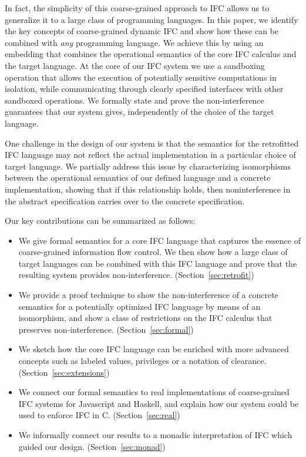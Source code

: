 In fact, the simplicity of this coarse-grained approach
to IFC allows us to generalize it to a large class of programming
languages.  In this paper, we identify the key concepts of coarse-grained
dynamic IFC and show how these can be combined with \emph{any} programming
language.  We achieve this
by using an embedding that combines the operational semantics
of the core IFC calculus and the target language.
At the core of our IFC system we use a sandboxing operation that allows
the execution of potentially sensitive computations in isolation,
while communicating through clearly specified interfaces with other
sandboxed operations.
We formally state and prove the non-interference guarantees that our
system gives, independently of the choice of the target language.

One challenge in the design of our system is that the semantics for the
retrofitted IFC language may not reflect the actual implementation in a
particular choice of target language.  We partially address this issue
by characterizing isomorphisms between the operational semantics of our
defined language and a concrete implementation, showing that if this
relationship holds, then noninterference in the abstract specification
carries over to the concrete specification.

Our key contributions can be summarized as follows:
\begin{itemize}
  \item We give formal semantics for a core IFC language that
      captures the essence of coarse-grained information flow control.
  We then show how a large class of target languages can be combined
  with this IFC language and prove that the resulting system provides
  non-interference. (Section~\ref{sec:retrofit})
  \item We provide a proof technique to show the non-interference
  of a concrete semantics for a potentially optimized IFC language
  by means of an isomorphism, and show a class of restrictions on
  the IFC calculus that preserves non-interference. (Section~\ref{sec:formal})
  \item We sketch how the core IFC language can be enriched with
  more advanced concepts such as labeled values, privileges or a
  notation of clearance. (Section~\ref{sec:extensions})
  \item We connect our formal semantics to real implementations of
  coarse-grained IFC systems for Javascript and Haskell, and explain
  how our system could be used to enforce IFC in C. (Section~\ref{sec:real})
  \item We informally connect our results to a monadic interpretation
      of IFC which guided our design. (Section~\ref{sec:monad})
\end{itemize}


